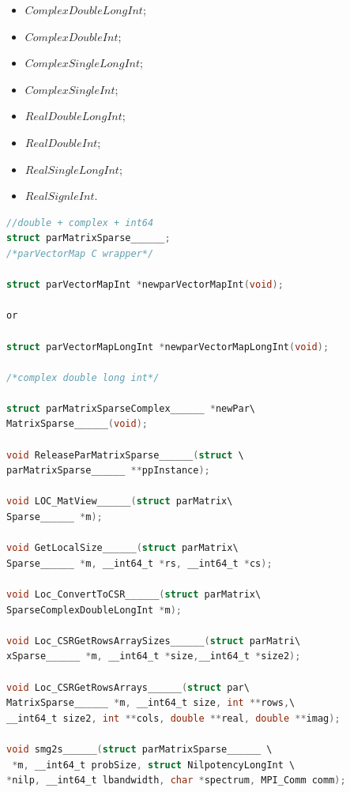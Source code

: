 \documentclass[a4paper, 10 pt]{report}
\begin{document}
	\begin{multicols}{2}
	\begin{itemize}
		\item $ComplexDoubleLongInt$;
		\item $ComplexDoubleInt$;
		\item $ComplexSingleLongInt$;
		\item $ComplexSingleInt$;
		\item $RealDoubleLongInt$;
		\item $RealDoubleInt$;
		\item $RealSingleLongInt$;
		\item $RealSignleInt$.
	\end{itemize}
	\end{multicols}

	\begin{lstlisting}[language=C,frame=single,	basicstyle=\footnotesize]
//double + complex + int64
struct parMatrixSparse______;   
/*parVectorMap C wrapper*/

struct parVectorMapInt *newparVectorMapInt(void);

or 

struct parVectorMapLongInt *newparVectorMapLongInt(void);

/*complex double long int*/
   
struct parMatrixSparseComplex______ *newPar\
MatrixSparse______(void);

void ReleaseParMatrixSparse______(struct \
parMatrixSparse______ **ppInstance);

void LOC_MatView______(struct parMatrix\
Sparse______ *m);

void GetLocalSize______(struct parMatrix\
Sparse______ *m, __int64_t *rs, __int64_t *cs);

void Loc_ConvertToCSR______(struct parMatrix\
SparseComplexDoubleLongInt *m);
   
void Loc_CSRGetRowsArraySizes______(struct parMatri\
xSparse______ *m, __int64_t *size,__int64_t *size2);

void Loc_CSRGetRowsArrays______(struct par\
MatrixSparse______ *m, __int64_t size, int **rows,\
__int64_t size2, int **cols, double **real, double **imag);

void smg2s______(struct parMatrixSparse______ \
 *m, __int64_t probSize, struct NilpotencyLongInt \
*nilp, __int64_t lbandwidth, char *spectrum, MPI_Comm comm);
   
	\end{lstlisting}
\end{document}
